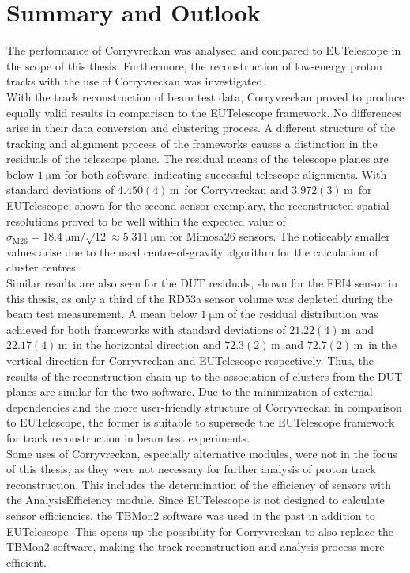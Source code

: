 \chapter{Summary and Outlook}
The performance of Corryvreckan was analysed and compared to EUTelescope in the scope of this thesis. Furthermore, the reconstruction of low-energy proton
tracks with the use of Corryvreckan was investigated.\\
With the track reconstruction of beam test data, Corryvreckan proved to produce equally valid results in comparison to the EUTelescope framework. No differences
arise in their data conversion and clustering process. A different structure of the tracking and alignment process of the frameworks causes a distinction in the residuals
of the telescope plane. The residual means of the telescope planes are below $\SI{1}{\micro\meter}$ for both software, indicating successful telescope alignments.
With standard deviations of $4.450(4)$\,\textmu m\, for Corryvreckan and $3.972(3)$\,\textmu m\, for EUTelescope, shown for the second sensor exemplary, the
reconstructed spatial resolutions proved to be well within
the expected value of $\sigma_{\text{M26}} = \SI{18.4}{\micro\meter}/\sqrt{12} \approx \SI{5.311}{\micro\meter}$ for Mimosa26 sensors. The noticeably smaller values
arise due to the used centre-of-gravity algorithm for the calculation of cluster centres. \\
Similar results are also seen for the DUT residuals, shown for the FEI4 sensor in this thesis, as only a third of the RD53a sensor volume was depleted during the beam test measurement.
A mean below $\SI{1}{\micro\meter}$ of the residual distribution was achieved for both frameworks with standard deviations of $21.22(4)$\,\textmu m\, and $22.17(4)$\,\textmu m\, in the horizontal direction and
$72.3(2)$\,\textmu m\, and $72.7(2)$\,\textmu m\, in the vertical direction for Corryvreckan and EUTelescope respectively.
Thus, the results of the reconstruction chain up to the
association of clusters from the DUT planes are similar for the two software. Due to the minimization of external dependencies and the more user-friendly structure of
Corryvreckan in comparison to EUTelescope, the former is suitable to supersede the EUTelescope framework for track reconstruction in beam test experiments. \\
Some uses of Corryvreckan, especially alternative modules, were not in the focus of this thesis,
as they were not necessary for further analysis of proton track reconstruction. This includes the determination of the
efficiency of sensors with the AnalysisEfficiency module. Since EUTelescope is not designed to calculate sensor efficiencies, the TBMon2 software was used in the past in addition
to EUTelescope. This opens up the possibility for Corryvreckan to also replace the TBMon2 software, making the track reconstruction and analysis process more efficient.

